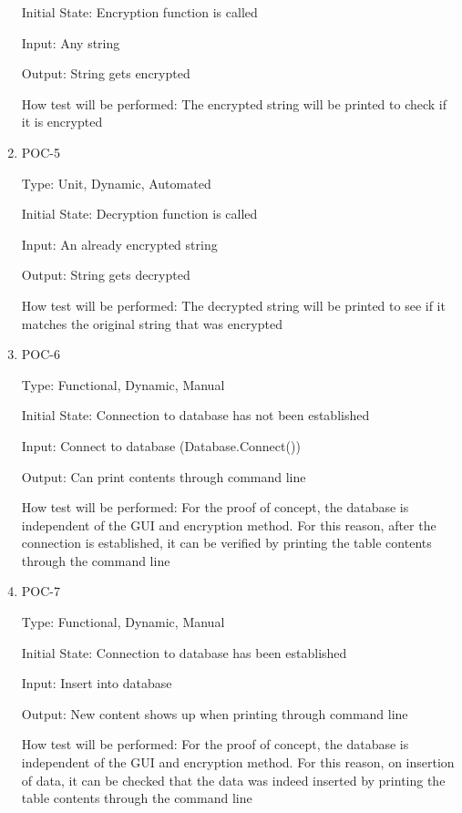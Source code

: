 \documentclass[12pt, titlepage]{article}
\begin{document}
\begin{enumerate}
Initial State: Encryption function is called

Input: Any string

Output: String gets encrypted

How test will be performed: The encrypted string will be printed to check if it is encrypted

\item{POC-5\\}

Type: Unit, Dynamic, Automated

Initial State: Decryption function is called

Input: An already encrypted string

Output: String gets decrypted

How test will be performed: The decrypted string will be printed to see if it matches the original string that was encrypted

\item{POC-6\\}

Type: Functional, Dynamic, Manual

Initial State: Connection to database has not been established

Input: Connect to database (Database.Connect())

Output: Can print contents through command line

How test will be performed: For the proof of concept, the database is independent of the GUI and encryption method. For this reason, after the connection is established, it can be verified by printing the table contents through the command line

\item{POC-7\\}

Type: Functional, Dynamic, Manual

Initial State: Connection to database has been established

Input: Insert into database

Output: New content shows up when printing through command line

How test will be performed: For the proof of concept, the database is independent of the GUI and encryption method. For this reason, on insertion of data, it can be checked that the data was indeed inserted by printing the table contents through the command line

\end{enumerate}
\end{document}
